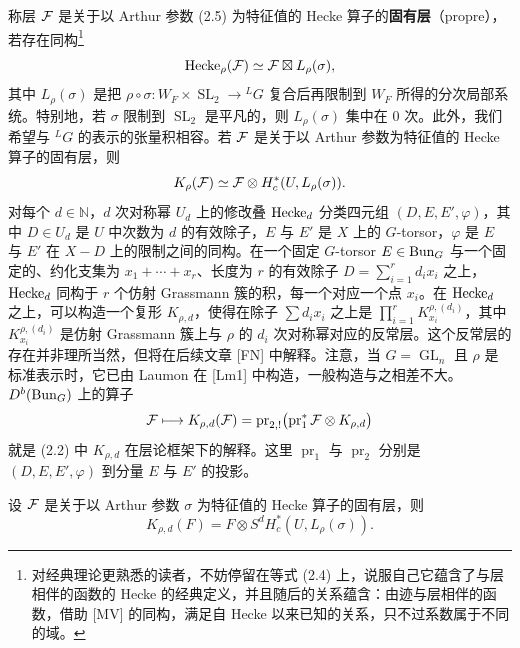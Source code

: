 称层 $\mathcal F$ 是关于以 Arthur 参数 (2.5) 为特征值的 Hecke 算子的\textbf{固有层}（propre），若存在同构\footnote{对经典理论更熟悉的读者，不妨停留在等式 (2.4) 上，说服自己它蕴含了与层相伴的函数的 Hecke 的经典定义，并且随后的关系蕴含：由迹与层相伴的函数，借助 [MV] 的同构，满足自 Hecke 以来已知的关系，只不过系数属于不同的域。}
\[
\mathrm{Hecke}_\rho(\mathcal F)\simeq\mathcal F\boxtimes L_\rho(\sigma),
\]
其中 $L_\rho(\sigma)$ 是把 $\rho\circ\sigma:W_F\times\operatorname{SL}_2\to{}^LG$ 复合后再限制到 $W_F$ 所得的分次局部系统。特别地，若 $\sigma$ 限制到 $\operatorname{SL}_2$ 是平凡的，则 $L_\rho(\sigma)$ 集中在 $0$ 次。此外，我们希望与 ${}^LG$ 的表示的张量积相容。若 $\mathcal F$ 是关于以 Arthur 参数为特征值的 Hecke 算子的固有层，则
\[
K_\rho(\mathcal F)\simeq\mathcal F\otimes H^*_c(U,L_\rho(\sigma)).
\]
对每个 $d\in\mathbb N$，$d$ 次对称幂 $U_d$ 上的修改叠 $\mathrm{Hecke}_d$ 分类四元组 $(D,E,E',\varphi)$，其中 $D\in U_d$ 是 $U$ 中次数为 $d$ 的有效除子，$E$ 与 $E'$ 是 $X$ 上的 $G$-torsor，$\varphi$ 是 $E$ 与 $E'$ 在 $X-D$ 上的限制之间的同构。在一个固定 $G$-torsor $E\in\mathrm{Bun}_G$ 与一个固定的、约化支集为 $x_1+\cdots+x_r$、长度为 $r$ 的有效除子 $D=\sum_{i=1}^r d_ix_i$ 之上，$\mathrm{Hecke}_d$ 同构于 $r$ 个仿射 Grassmann 簇的积，每一个对应一个点 $x_i$。在 $\mathrm{Hecke}_d$ 之上，可以构造一个复形 $K_{\rho,d}$，使得在除子 $\sum d_ix_i$ 之上是 $\prod_{i=1}^rK^{\rho,(d_i)}_{x_i}$，其中 $K^{\rho,(d_i)}_{x_i}$ 是仿射 Grassmann 簇上与 $\rho$ 的 $d_i$ 次对称幂对应的反常层。这个反常层的存在并非理所当然，但将在后续文章 [FN] 中解释。注意，当 $G=\operatorname{GL}_n$ 且 $\rho$ 是标准表示时，它已由 Laumon 在 [Lm1] 中构造，一般构造与之相差不大。$D^b(\mathrm{Bun}_G)$ 上的算子
\[
\mathcal F\longmapsto K_{\rho,d}(\mathcal F)=\operatorname{pr}_{2,!}\bigl(\operatorname{pr}_1^*\mathcal F\otimes K_{\rho,d}\bigr)
\]
就是 (2.2) 中 $K_{\rho,d}$ 在层论框架下的解释。这里 $\operatorname{pr}_1$ 与 $\operatorname{pr}_2$ 分别是 $(D,E,E',\varphi)$ 到分量 $E$ 与 $E'$ 的投影。

\setcounter{theorem}{5}
\begin{lemma}
设 $\mathcal F$ 是关于以 Arthur 参数 $\sigma$ 为特征值的 Hecke 算子的固有层，则
\begin{equation}\tag{2.7}
K_{\rho,d}(F)=F\otimes S^dH^*_c(U,L_\rho(\sigma)).
\end{equation}
\end{lemma}

